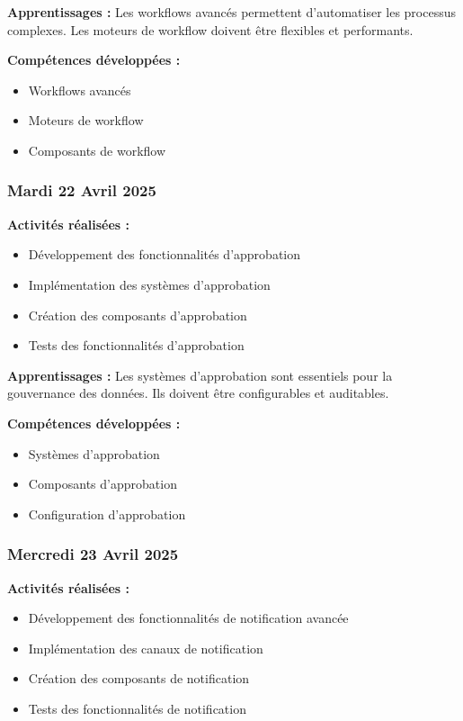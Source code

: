 \documentclass[12pt,a4paper]{article}
\begin{document}
\textbf{Apprentissages :}
Les workflows avancés permettent d'automatiser les processus complexes. Les moteurs de workflow doivent être flexibles et performants.

\textbf{Compétences développées :}
\begin{itemize}
    \item Workflows avancés
    \item Moteurs de workflow
    \item Composants de workflow
\end{itemize}

\subsubsection{Mardi 22 Avril 2025}
\textbf{Activités réalisées :}
\begin{itemize}
    \item Développement des fonctionnalités d'approbation
    \item Implémentation des systèmes d'approbation
    \item Création des composants d'approbation
    \item Tests des fonctionnalités d'approbation
\end{itemize}

\textbf{Apprentissages :}
Les systèmes d'approbation sont essentiels pour la gouvernance des données. Ils doivent être configurables et auditables.

\textbf{Compétences développées :}
\begin{itemize}
    \item Systèmes d'approbation
    \item Composants d'approbation
    \item Configuration d'approbation
\end{itemize}

\subsubsection{Mercredi 23 Avril 2025}
\textbf{Activités réalisées :}
\begin{itemize}
    \item Développement des fonctionnalités de notification avancée
    \item Implémentation des canaux de notification
    \item Création des composants de notification
    \item Tests des fonctionnalités de notification
\end{itemize}
\end{document}
